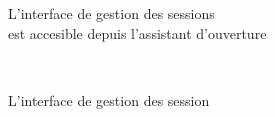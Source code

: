 \begin{figure}[h!]
\centering
{}
\caption{L'interface de gestion des sessions\\est accesible depuis l'assistant d'ouverture}

\end{figure}
~
\begin{figure}[h!]
\centering
{}
\caption{L'interface de gestion des session}
\end{figure}